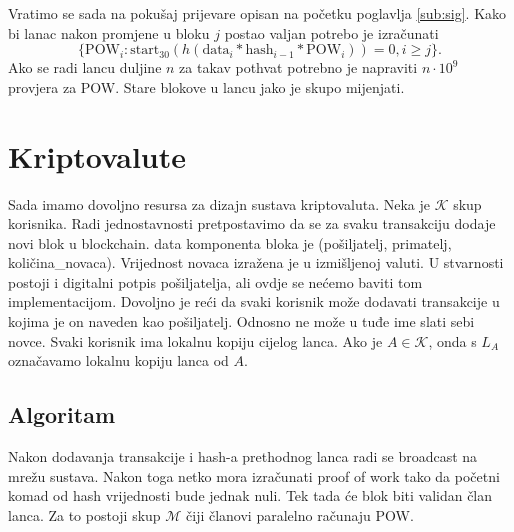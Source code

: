 \documentclass[12pt]{scrartcl} %
\newcommand{\tt}[1]{
\text{#1}
}
\newcommand{\korisnici}{\mathcal{K}}
\newcommand{\miners}{\mathcal{M}}
\begin{document}
Vratimo se sada na pokušaj prijevare opisan na početku poglavlja \ref{sub:sig}. Kako bi lanac nakon promjene u bloku $j$ postao valjan potrebo je izračunati
\[ \{\tt{POW}_i : \tt{start}_{30}(h(\tt{data}_i * \tt{hash}_{i-1} * \tt{POW}_i )) = 0, i \geq j\} .\]
Ako se radi lancu duljine $n$ za takav pothvat potrebno je napraviti $n\cdot 10^{9}$ provjera za POW. Stare blokove u lancu jako je skupo mijenjati. 

\section{Kriptovalute}
Sada imamo dovoljno resursa za dizajn sustava kriptovaluta. Neka je $\korisnici$ skup korisnika. Radi jednostavnosti pretpostavimo da se za svaku transakciju dodaje novi blok u block\-chain. data komponenta bloka je (pošiljatelj, primatelj, količina\_novaca). Vrijednost novaca izražena je u izmišljenoj valuti. U stvarnosti postoji i digitalni potpis pošiljatelja, ali ovdje se nećemo baviti tom implementacijom. Dovoljno je reći da svaki korisnik može dodavati transakcije u kojima je on naveden kao pošiljatelj. Odnosno ne može u tuđe ime slati sebi novce. Svaki korisnik ima lokalnu kopiju cijelog lanca. Ako je $A \in \korisnici$, onda s $L_A$ označavamo lokalnu kopiju lanca od $A$. 
\subsection{Algoritam}
Nakon dodavanja transakcije i hash-a prethodnog lanca radi se broadcast na mrežu sustava. Nakon toga netko mora izračunati proof of work tako da početni komad od hash vrijednosti bude jednak nuli. Tek tada će blok biti validan član lanca. Za to postoji skup $\miners$ čiji članovi paralelno računaju POW. 
\end{document}

